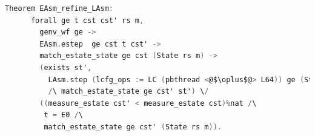 \begin{lstlisting}[language=C]
    Theorem EAsm_refine_LAsm:
      forall ge t cst cst' rs m, 
        genv_wf ge ->
        EAsm.estep  ge cst t cst' -> 
        match_estate_state ge cst (State rs m) ->
        (exists st',
          LAsm.step (lcfg_ops := LC (pbthread <@$\oplus$@> L64)) ge (State rs m) t st'
          /\ match_estate_state ge cst' st') \/
        ((measure_estate cst' < measure_estate cst)%nat /\
         t = E0 /\
         match_estate_state ge cst' (State rs m)).
\end{lstlisting}
%
%
%

